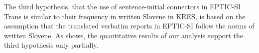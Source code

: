 \documentclass[output=paper]{langscibook}
\begin{document}
The third hypothesis, that the use of sentence-initial connectors in EPTIC-SI Trans is similar to their frequency in written Slovene in KRES, is based on the assumption that the translated verbatim reports in EPTIC-SI follow the norms of written Slovene. As  shows, the quantitative results of our analysis support the third hypothesis only partially.






\end{document}
